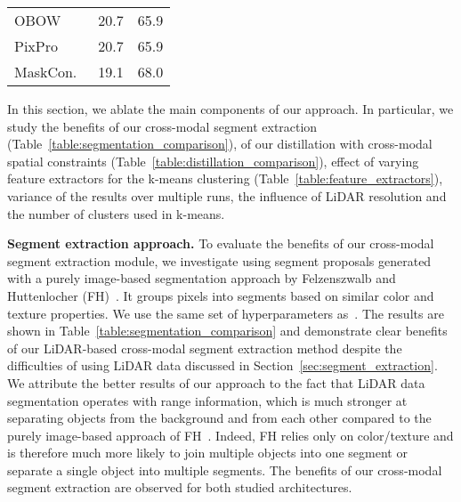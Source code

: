 \documentclass[runningheads]{llncs}
\newcommand{\paragraphcustom}[1]{\smallskip\noindent\textbf{#1}}
\begin{document}
\begin{table}[t!]
{{\begin{tabular}[t]{l|rr}
\hspace{1mm}OBOW~\cite{gidaris2021obow} & 20.7 & 65.9 \\
\hspace{1mm}PixPro~\cite{xie2020propagate} & 20.7 & 65.9 \\
\hspace{1mm}MaskCon.~\cite{van2021unsupervised} & 19.1 & 68.0 \\
\toprule
\end{tabular}
         }
    }
    \vspace{-15pt}
    \addtocounter{table}{+1}
\end{table}





In this section, we ablate the main components of our 
approach. In particular, we study the benefits of our cross-modal segment extraction (Table~\ref{table:segmentation_comparison}),
of our distillation with cross-modal spatial constraints (Table~\ref{table:distillation_comparison}), 
effect of varying feature extractors for the k-means clustering (Table~\ref{table:feature_extractors}),
variance of the results over multiple runs, the influence of LiDAR resolution and the number of clusters used in k-means.

\paragraphcustom{Segment extraction approach.}
To evaluate the benefits of our cross-modal segment extraction module, we investigate using segment proposals generated with a purely image-based segmentation approach by Felzenszwalb and Huttenlocher (FH)~\cite{felzenszwalb2004efficient}. It groups pixels into segments based on similar color and texture properties.
We use the same set of hyperparameters as~\cite{henaff2021efficient}.  
The results are shown in Table~\ref{table:segmentation_comparison} 
and demonstrate clear benefits of our LiDAR-based cross-modal segment extraction method despite the difficulties of using LiDAR data discussed in Section~\ref{sec:segment_extraction}. 
We attribute the better results of our approach
to the fact that LiDAR 
data
segmentation operates with range information, which is much stronger at separating objects from the background and from each other compared to the purely image-based approach of FH~\cite{felzenszwalb2004efficient}. Indeed, FH relies only on color/texture and is therefore much more likely to join multiple objects into one segment or separate a single object into multiple segments. 
The benefits of our 
cross-modal segment extraction 
are observed for 
both studied
architectures.
\end{document}

